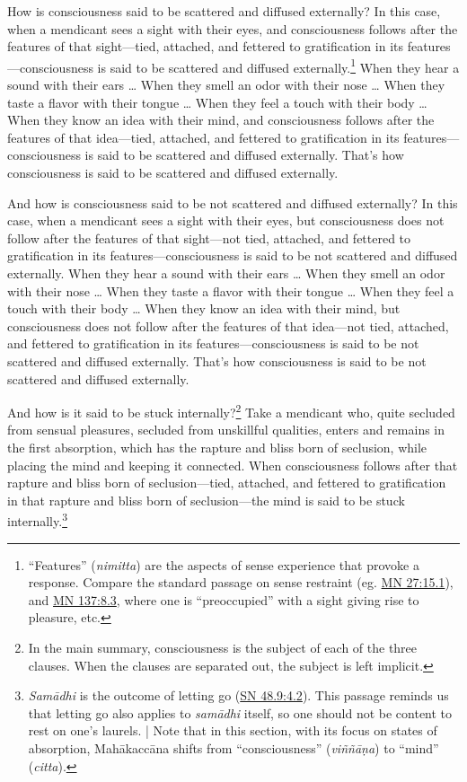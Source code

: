 \documentclass[12pt,openany]{book}%
\begin{document}
How is consciousness said to be scattered and diffused externally? In this case, when a mendicant sees a sight with their eyes, and consciousness follows after the features of that sight—tied, attached, and fettered to gratification in its features—consciousness is said to be scattered and diffused externally.\footnote{“Features” (\textit{nimitta}) are the aspects of sense experience that provoke a response. Compare the standard passage on sense restraint (eg. \href{https://suttacentral.net/mn27/en/sujato\#15.1}{MN 27:15.1}), and \href{https://suttacentral.net/mn137/en/sujato\#8.3}{MN 137:8.3}, where one is “preoccupied” with a sight giving rise to pleasure, etc. } When they hear a sound with their ears … When they smell an odor with their nose … When they taste a flavor with their tongue … When they feel a touch with their body … When they know an idea with their mind, and consciousness follows after the features of that idea—tied, attached, and fettered to gratification in its features—consciousness is said to be scattered and diffused externally. That’s how consciousness is said to be scattered and diffused externally. 

And how is consciousness said to be not scattered and diffused externally? In this case, when a mendicant sees a sight with their eyes, but consciousness does not follow after the features of that sight—not tied, attached, and fettered to gratification in its features—consciousness is said to be not scattered and diffused externally. When they hear a sound with their ears … When they smell an odor with their nose … When they taste a flavor with their tongue … When they feel a touch with their body … When they know an idea with their mind, but consciousness does not follow after the features of that idea—not tied, attached, and fettered to gratification in its features—consciousness is said to be not scattered and diffused externally. That’s how consciousness is said to be not scattered and diffused externally. 

And how is it said to be stuck internally?\footnote{In the main summary, consciousness is the subject of each of the three clauses. When the clauses are separated out, the subject is left implicit. } Take a mendicant who, quite secluded from sensual pleasures, secluded from unskillful qualities, enters and remains in the first absorption, which has the rapture and bliss born of seclusion, while placing the mind and keeping it connected. When consciousness follows after that rapture and bliss born of seclusion—tied, attached, and fettered to gratification in that rapture and bliss born of seclusion—the mind is said to be stuck internally.\footnote{\textit{\textsanskrit{Samādhi}} is the outcome of letting go (\href{https://suttacentral.net/sn48.9/en/sujato\#4.2}{SN 48.9:4.2}). This passage reminds us that letting go also applies to \textit{\textsanskrit{samādhi}} itself, so one should not be content to rest on one’s laurels. | Note that in this section, with its focus on states of absorption, \textsanskrit{Mahākaccāna} shifts from “consciousness” (\textit{\textsanskrit{viññāṇa}}) to “mind” (\textit{citta}). } 
\end{document}
